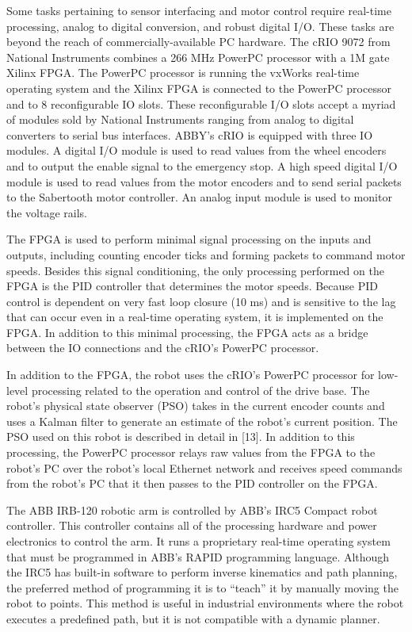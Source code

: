 \documentclass[]{cwru} %
\begin{document}
Some tasks pertaining to sensor interfacing and motor control require
real-time processing, analog to digital conversion, and robust digital
I/O. These tasks are beyond the reach of commercially-available PC
hardware. The cRIO 9072 from National Instruments combines a 266 MHz
PowerPC processor with a 1M gate Xilinx FPGA. The PowerPC processor is
running the vxWorks real-time operating system and the Xilinx FPGA is
connected to the PowerPC processor and to 8 reconfigurable IO slots.
These reconfigurable I/O slots accept a myriad of modules sold by
National Instruments ranging from analog to digital converters to serial
bus interfaces. ABBY's cRIO is equipped with three IO modules. A digital
I/O module is used to read values from the wheel encoders and to output
the enable signal to the emergency stop. A high speed digital I/O module
is used to read values from the motor encoders and to send serial
packets to the Sabertooth motor controller. An analog input module is
used to monitor the voltage rails.

The FPGA is used to perform minimal signal processing on the inputs and
outputs, including counting encoder ticks and forming packets to command
motor speeds. Besides this signal conditioning, the only processing
performed on the FPGA is the PID controller that determines the motor
speeds. Because PID control is dependent on very fast loop closure (10
ms) and is sensitive to the lag that can occur even in a real-time
operating system, it is implemented on the FPGA. In addition to this
minimal processing, the FPGA acts as a bridge between the IO connections
and the cRIO's PowerPC processor.

In addition to the FPGA, the robot uses the cRIO's PowerPC processor for
low-level processing related to the operation and control of the drive
base. The robot's physical state observer (PSO) takes in the current
encoder counts and uses a Kalman filter to generate an estimate of the
robot's current position. The PSO used on this robot is described in
detail in {[}13{]}. In addition to this processing, the PowerPC
processor relays raw values from the FPGA to the robot's PC over the
robot's local Ethernet network and receives speed commands from the
robot's PC that it then passes to the PID controller on the FPGA.

The ABB IRB-120 robotic arm is controlled by ABB's IRC5 Compact robot
controller. This controller contains all of the processing hardware and
power electronics to control the arm. It runs a proprietary real-time
operating system that must be programmed in ABB's RAPID programming
language. Although the IRC5 has built-in software to perform inverse
kinematics and path planning, the preferred method of programming it is
to ``teach'' it by manually moving the robot to points. This method is
useful in industrial environments where the robot executes a predefined
path, but it is not compatible with a dynamic planner.
\end{document}
